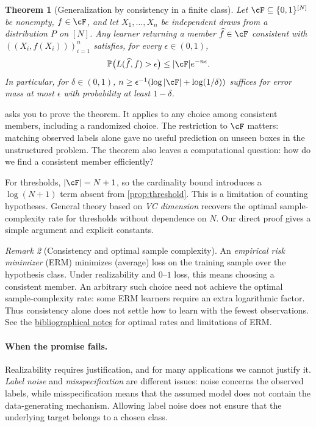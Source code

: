 \documentclass[11pt,twoside]{article}
\renewcommand{\P}{\mathbb P}
\newtheorem{theorem}{Theorem}[section]
\theoremstyle{definition}
\theoremstyle{remark}
\newtheorem{remark}[theorem]{Remark}
\begin{document}
\begin{theorem}[Generalization by consistency in a finite class]
\label{thm:finite-class-consistency}
Let $\cF\subseteq\{0,1\}^{[N]}$ be nonempty, $f\in\cF$, and let
$X_1,\ldots,X_n$ be independent draws from a distribution $P$ on $[N]$.
Any learner returning a member $\widehat f\in\cF$ consistent with
$((X_i,f(X_i)))_{i=1}^n$ satisfies, for every $\epsilon\in(0,1)$,
\begin{equation}
\P\bigl(L(\widehat f,f)>\epsilon\bigr)
\le |\cF|e^{-n\epsilon}.
\label{eq:finite-class-consistency}
\end{equation}
In particular, for $\delta\in(0,1)$,
$n\ge\epsilon^{-1}(\log|\cF|+\log(1/\delta))$ suffices for error mass
at most $\epsilon$ with probability at least $1-\delta$.
\end{theorem}

 asks you to prove the theorem. It applies
to any choice among consistent members, including a randomized choice.
The restriction to $\cF$ matters: matching observed labels alone gave no
useful prediction on unseen boxes in the unstructured problem. The theorem
also leaves a computational question: how do we find a consistent member
efficiently?

For thresholds, $|\cF|=N+1$, so the cardinality bound introduces a
$\log(N+1)$ term absent from \cref{prop:threshold}. This is a limitation of
counting hypotheses. General theory based on \emph{VC dimension}
recovers the optimal sample-complexity rate for thresholds
without dependence on $N$. Our direct proof gives a simple argument and
explicit constants.

\begin{remark}[Consistency and optimal sample complexity]
\label{rem:erm-optimal-rates}
An \emph{empirical risk minimizer} (ERM) minimizes (average) loss on the
training sample over the hypothesis class. Under realizability and $0$--$1$
loss, this means choosing a consistent member. An arbitrary such choice
need not achieve the optimal sample-complexity rate: some ERM learners
require an extra logarithmic factor. Thus consistency alone does not settle
how to learn with the fewest observations. See
the \hyperref[sec:bibliographical-notes]{bibliographical notes} for
optimal rates and limitations of ERM.
\end{remark}

\paragraph{When the promise fails.}
Realizability requires justification, and for many applications we cannot
justify it. \emph{Label noise} and \emph{misspecification} are different issues: noise
concerns the observed labels, while misspecification means that the assumed
model does not contain the data-generating mechanism. Allowing label noise
does not ensure that the underlying target belongs to a chosen class.
\end{document}
